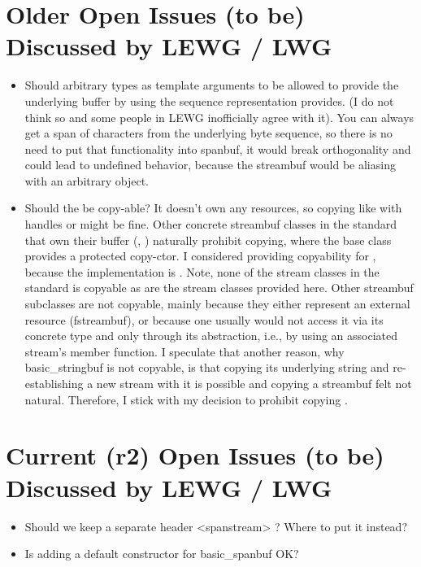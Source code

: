 \documentclass[ebook,11pt,article]{memoir}
\begin{document}
\section{Older Open Issues (to be) Discussed by LEWG / LWG}
\begin{itemize}
\item Should arbitrary types as template arguments to  be allowed to provide the underlying buffer by using the  sequence representation  provides. (I do not think so and some people in LEWG inofficially agree with it). You can always get a span of characters from the underlying byte sequence, so there is no need to put that functionality into spanbuf, it would break orthogonality and could lead to undefined behavior, because the streambuf would be aliasing with an arbitrary object.
\item Should the  be copy-able? It doesn't own any resources, so copying like with handles or  might be fine. Other concrete streambuf classes in the standard that own their buffer (, ) naturally prohibit copying, where the base class  provides a protected copy-ctor. I considered providing copyability for , because the implementation is . Note, none of the stream classes in the standard is copyable as are the stream classes provided here. Other streambuf subclasses are not copyable, mainly because they either represent an external resource (fstreambuf), or because one usually would not access it via its concrete type and only through its  abstraction, i.e., by using an associated stream's  member function. I speculate that another reason, why basic_stringbuf is not copyable, is that copying its underlying string and re-establishing a new stream with it is possible and copying a streambuf felt not natural. Therefore, I stick with my decision to prohibit copying .
\end{itemize}


\section{Current (r2) Open Issues (to be) Discussed by LEWG / LWG}
\begin{itemize}
\item Should we keep a separate header <spanstream> ? Where to put it instead?
\item Is adding a default constructor for basic_spanbuf OK?
\end{itemize}
\end{document}
